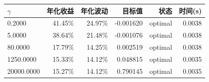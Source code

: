 \begin{center}
\small
\begin{tabular}{lrrrrr}
\toprule
$\gamma$ & 年化收益 & 年化波动 & 目标值 & 状态 & 时间(s) \\
\midrule
0.2000 & 41.45\% & 24.97\% & -0.001620 & optimal & 0.0038 \\
5.0000 & 38.64\% & 21.48\% & -0.001076 & optimal & 0.0038 \\
80.0000 & 17.79\% & 14.25\% & 0.002519 & optimal & 0.0038 \\
1250.0000 & 15.33\% & 14.12\% & 0.048815 & optimal & 0.0035 \\
20000.0000 & 15.27\% & 14.12\% & 0.790145 & optimal & 0.0035 \\
\bottomrule
\end{tabular}
\end{center}